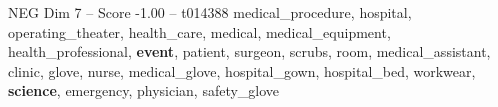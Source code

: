 \begin{textsample}{NEG Dim 7 – Score -1.00 – t014388}  \label{ex:f7_neg_008}
medical\_procedure, hospital, operating\_theater, health\_care, medical, medical\_equipment, health\_professional, \textbf{event}, patient, surgeon, scrubs, room, medical\_assistant, clinic, glove, nurse, medical\_glove, hospital\_gown, hospital\_bed, workwear, \textbf{science}, emergency, physician, safety\_glove

\end{textsample}
